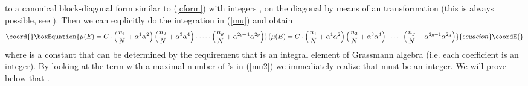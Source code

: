 \documentclass[a4paper,a4paper]{article}
\begin{document}
to a canonical block-diagonal 
form similar to (\ref{cform}) with integers \coordHE{}, \coordHE{} on the diagonal  by means of an \coordHE{} transformation 
(this is always possible, see \cite{Igusa}). 
Then we can explicitly do the integration in (\ref{mu}) and obtain 
\begin{equation}\coord{}\boxEquation{\label{mu2}
\mu(E) = C\cdot \left(\frac{n_{1}}{N} + \alpha^{1}\alpha^{2}\right) \left(\frac{n_{2}}{N} + \alpha^{3}\alpha^{4}\right)\cdot \dots 
\cdot \left(\frac{n_{g}}{N} + \alpha^{2g-1}\alpha^{2g}\right)
}{\mu(E) = C\cdot \left(\frac{n_{1}}{N} + \alpha^{1}\alpha^{2}\right) \left(\frac{n_{2}}{N} + \alpha^{3}\alpha^{4}\right)\cdot \dots 
\cdot \left(\frac{n_{g}}{N} + \alpha^{2g-1}\alpha^{2g}\right)
}{ecuacion}\coordE{}\end{equation}
where \coordHE{} is a constant that can be determined by the requirement that \coordHE{} is an integral element 
of Grassmann algebra \myHighlight{$\Lambda$}\coordHE{} (i.e. each coefficient  is an integer). By looking at the term with a maximal number 
 of \myHighlight{$\alpha$}\coordHE{}'s in (\ref{mu2}) we immediately realize that \coordHE{} must be an integer.   We will prove below that \coordHE{}.
\end{document}
